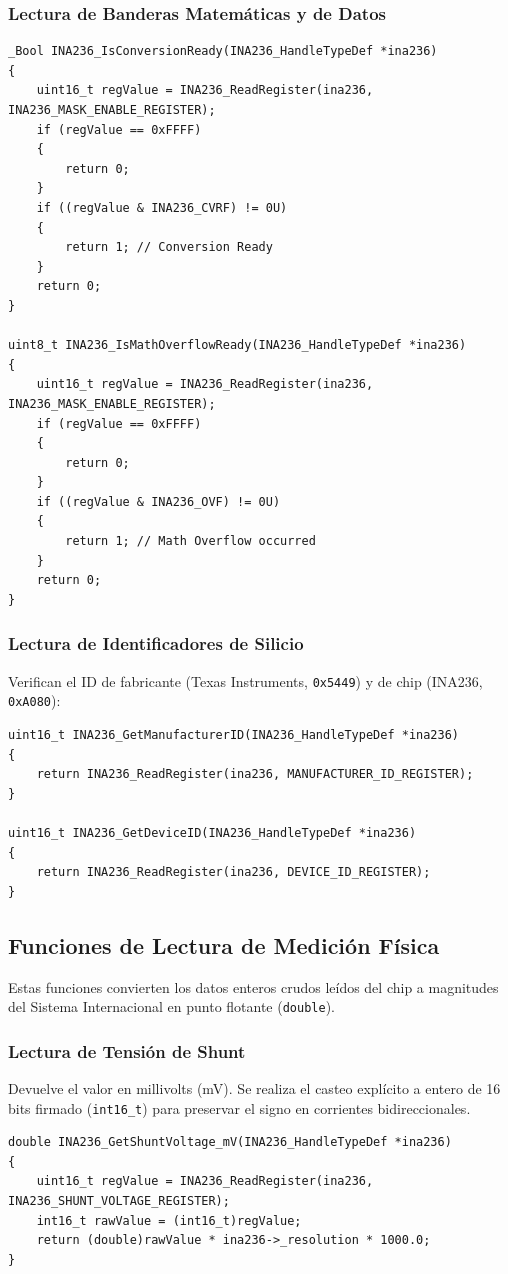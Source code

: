 \documentclass[
10pt, %
a4paper, %
oneside, %
headinclude,footinclude, %
BCOR5mm, %
]{scrartcl}
\begin{document}
\subsubsection{Lectura de Banderas Matemáticas y de Datos}
\begin{lstlisting}[style=CMakeStyle]
_Bool INA236_IsConversionReady(INA236_HandleTypeDef *ina236)
{
    uint16_t regValue = INA236_ReadRegister(ina236, INA236_MASK_ENABLE_REGISTER);
    if (regValue == 0xFFFF)
    {
        return 0;
    }
    if ((regValue & INA236_CVRF) != 0U)
    {
        return 1; // Conversion Ready
    }
    return 0;
}

uint8_t INA236_IsMathOverflowReady(INA236_HandleTypeDef *ina236)
{
    uint16_t regValue = INA236_ReadRegister(ina236, INA236_MASK_ENABLE_REGISTER);
    if (regValue == 0xFFFF)
    {
        return 0;
    }
    if ((regValue & INA236_OVF) != 0U)
    {
        return 1; // Math Overflow occurred
    }
    return 0;
}
\end{lstlisting}

\subsubsection{Lectura de Identificadores de Silicio}
Verifican el ID de fabricante (Texas Instruments, \texttt{0x5449}) y de chip (INA236, \texttt{0xA080}):
\begin{lstlisting}[style=CMakeStyle]
uint16_t INA236_GetManufacturerID(INA236_HandleTypeDef *ina236)
{
    return INA236_ReadRegister(ina236, MANUFACTURER_ID_REGISTER);
}

uint16_t INA236_GetDeviceID(INA236_HandleTypeDef *ina236)
{
    return INA236_ReadRegister(ina236, DEVICE_ID_REGISTER);
}
\end{lstlisting}

\subsection{Funciones de Lectura de Medición Física}
Estas funciones convierten los datos enteros crudos leídos del chip a magnitudes del Sistema Internacional en punto flotante (\texttt{double}).

\subsubsection{Lectura de Tensión de Shunt}
Devuelve el valor en millivolts (mV). Se realiza el casteo explícito a entero de 16 bits firmado (\texttt{int16\_t}) para preservar el signo en corrientes bidireccionales.
\begin{lstlisting}[style=CMakeStyle]
double INA236_GetShuntVoltage_mV(INA236_HandleTypeDef *ina236)
{
    uint16_t regValue = INA236_ReadRegister(ina236, INA236_SHUNT_VOLTAGE_REGISTER);
    int16_t rawValue = (int16_t)regValue;
    return (double)rawValue * ina236->_resolution * 1000.0;
}
\end{lstlisting}
\end{document}
